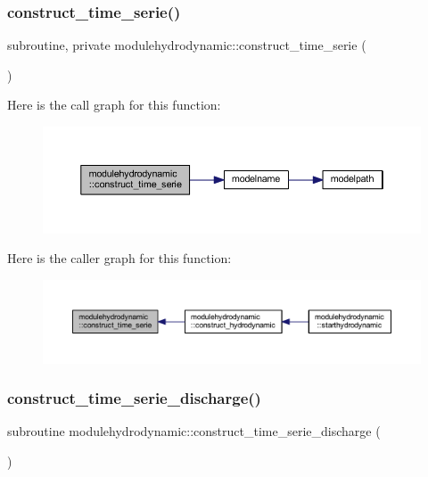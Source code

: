 \subsubsection{\texorpdfstring{construct\+\_\+time\+\_\+serie()}{construct\_time\_serie()}}
{\footnotesize\ttfamily subroutine, private modulehydrodynamic\+::construct\+\_\+time\+\_\+serie (\begin{DoxyParamCaption}{ }\end{DoxyParamCaption})\hspace{0.3cm}{\ttfamily [private]}}

Here is the call graph for this function\+:\nopagebreak
\begin{figure}[H]
\begin{center}
\leavevmode
\includegraphics[width=350pt]{namespacemodulehydrodynamic_a50ddc8a159376915f9ee9328f388d4fe_cgraph}
\end{center}
\end{figure}
Here is the caller graph for this function\+:\nopagebreak
\begin{figure}[H]
\begin{center}
\leavevmode
\includegraphics[width=350pt]{namespacemodulehydrodynamic_a50ddc8a159376915f9ee9328f388d4fe_icgraph}
\end{center}
\end{figure}
\mbox{\label{namespacemodulehydrodynamic_ae0edf0b5ed199a732c27734b798443ab}} 
\subsubsection{\texorpdfstring{construct\+\_\+time\+\_\+serie\+\_\+discharge()}{construct\_time\_serie\_discharge()}}
{\footnotesize\ttfamily subroutine modulehydrodynamic\+::construct\+\_\+time\+\_\+serie\+\_\+discharge (\begin{DoxyParamCaption}{ }\end{DoxyParamCaption})\hspace{0.3cm}{\ttfamily [private]}}

